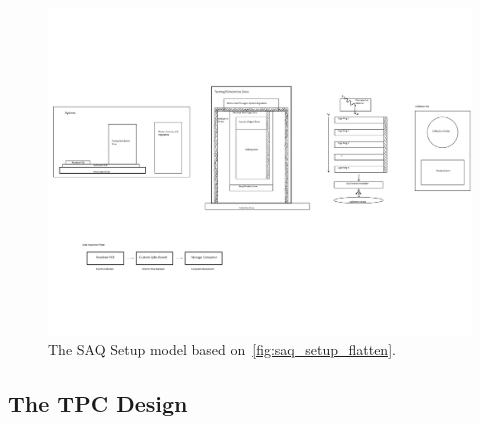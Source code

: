 \begin{figure}[]
\centering
\includegraphics[width=\textwidth]{images/SAQ_setup_diagram.pdf}
\caption{The SAQ Setup model based on~\ref{fig:saq_setup_flatten}.}
\label{fig:saq_physical_setup_flatten}
\end{figure}

\subsection{The TPC Design}

